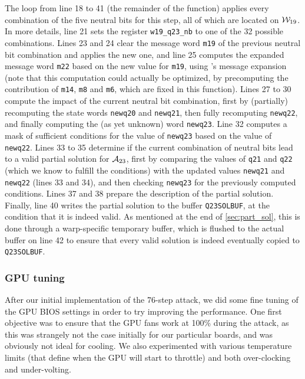 The loop from line 18 to 41 (\ie the remainder of the function) applies every combination of the five neutral bits for this step, all of which 
are located on $\mathcal{W}_{19}$. In more details, line 21 sets the register
\texttt{w19_q23_nb} to one of the 32 possible combinations. Lines 23 and 24 clear the message word \texttt{m19} of the previous neutral bit combination and applies the new one, and line 25
computes the expanded message word \texttt{m22} based on the new value for \texttt{m19}, using \shaone's message expansion (note that this computation could actually be optimized, \eg by
precomputing the contribution of \texttt{m14}, \texttt{m8} and \texttt{m6}, which are fixed in this function).
Lines 27 to 30 compute the impact of the current neutral bit combination, first by (partially) recomputing the state words \texttt{newq20} and \texttt{newq21}, then fully recomputing
\texttt{newq22}, and finally computing the (as yet unknown) word \texttt{newq23}.
Line 32 computes a mask of sufficient conditions for the value of \texttt{newq23} based on the value of \texttt{newq22}.
Lines 33 to 35 determine if the current combination of neutral bits lead to a valid partial solution for $\mathcal{A}_{23}$, first by comparing the values of \texttt{q21} and  \texttt{q22}
(which we know to fulfill the conditions) with the updated values \texttt{newq21} and \texttt{newq22} (lines 33 and 34), and then checking \texttt{newq23} for the previously computed conditions.
Lines 37 and 38 prepare the description of the partial solution.
Finally, line 40 writes the partial solution to the buffer \texttt{Q23SOLBUF}, at the condition that it is indeed valid. As mentioned at the end of \autoref{sec:part_sol}, this is done through a warp-specific
temporary buffer, which is flushed to the actual buffer on line 42 to ensure that every valid solution is indeed eventually copied to \texttt{Q23SOLBUF}.



\subsubsection{GPU tuning}
\label{sec:gpu_tune}

After our initial implementation of the 76-step attack, we did some fine tuning of the GPU BIOS settings in order to try improving the performance.
One first objective was to ensure that the GPU fans work at 100\% during the attack, as this was strangely
not the case initially for our particular boards, and was obviously not ideal for cooling.
We also experimented with various temperature limits
(that define when the GPU will start to throttle) and both over-clocking and under-volting.

